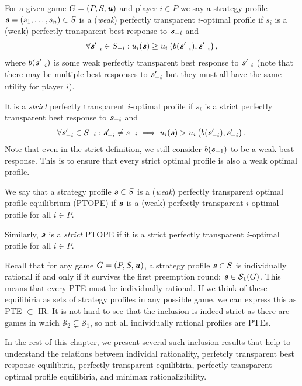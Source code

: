 \begin{definition}
	For a given game $G = (P, S, \boldsymbol{\mathit{u}})$ and player $i \in P$ we say a strategy profile $\boldsymbol{\mathit{s}} = (s_1, \dots, s_n) \in S$ is a (\textit{weak}) perfectly transparent $i$-optimal profile if
	$s_i$ is a (weak) perfectly transparent best response to $\boldsymbol{\mathit{s}}_{-i}$ and
	\[
		\forall \boldsymbol{\mathit{s}}'_{-i} \in S_{-i}: u_i(\boldsymbol{\mathit{s}}) \ge u_i\left(b(\boldsymbol{\mathit{s}}'_{-i}), \boldsymbol{\mathit{s}}'_{-i}\right),
	\]
	where $b(\boldsymbol{\mathit{s}}'_{-i})$ is some weak perfectly transparent best response to $\boldsymbol{\mathit{s}}'_{-i}$ (note that there may be multiple best responses to $\boldsymbol{\mathit{s}}'_{-i}$ but they must all have the same utility for player $i$).

	It is a \textit{strict} perfectly transparent $i$-optimal profile if $s_i$ is a strict perfectly transparent best response to $\boldsymbol{\mathit{s}}_{-i}$ and
	\[
		\forall \boldsymbol{\mathit{s}}_{-i}' \in S_{-i}: \boldsymbol{\mathit{s}}_{-i}' \ne s_{-i} \implies u_i(\boldsymbol{\mathit{s}}) > u_i\left(b(\boldsymbol{\mathit{s}}_{-i}'), \boldsymbol{\mathit{s}}_{-i}'\right).
	\]
	Note that even in the strict definition, we still consider $b(\boldsymbol{\mathit{s}}_{-1})$ to be a weak best response.
	This is to ensure that every strict optimal profile is also a weak optimal profile.
\end{definition}

\begin{definition}
	We say that a strategy profile $\boldsymbol{\mathit{s}} \in S$ is a (\textit{weak}) perfectly transparent optimal profile equilibrium (PTOPE) if $\boldsymbol{\mathit{s}}$ is a (weak) perfectly transparent $i$-optimal profile for all $i \in P$.

	Similarly, $\boldsymbol{\mathit{s}}$ is a \textit{strict} PTOPE if it is a strict perfectly transparent $i$-optimal profile for all $i \in P$.
\end{definition}

Recall that for any game $G = (P, S, \boldsymbol{\mathit{u}})$, a strategy profile $\boldsymbol{\mathit{s}} \in S$ is individually rational if and only if it survives the first preemption round: $\boldsymbol{\mathit{s}} \in \mathcal{S}_1(G)$.
This means that every PTE must be individually rational.
If we think of these equilibiria as sets of strategy profiles in any possible game, we can express this as PTE $\subset$ IR.
It is not hard to see that the inclusion is indeed strict as there are games in which $\mathcal{S}_2 \subsetneq \mathcal{S}_1$, so not all individually rational profiles are PTEs.

In the rest of this chapter, we present several such inclusion results that help to understand the relations between individal rationality, perfetcly transparent best response equilibiria, perfectly transparent equilibiria, perfectly transparent optimal profile equilibiria, and minimax rationalizibility.


